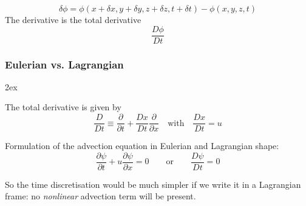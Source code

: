\documentclass[aspectratio=149,9pt]{beamer}
\begin{document}
\begin{frame}
\hspace*{1cm}%
	\parbox[b]{.55\textwidth}{
		\begin{equation*}
			\delta \phi = \phi (x + \delta x, y + \delta y, z + \delta z, t + \delta t) -\phi (x,y,z,t)
		\end{equation*}
		The derivative is the total derivative
		\begin{equation*}
			 \frac{D \phi}{D t}
		\end{equation*}
	}
\end{frame}
%
%
\begin{frame}
	\frametitle{Eulerian vs. Lagrangian}
	\begin{myitemize}{2ex}
		\item The total derivative is given by
			\begin{equation*}
				\frac{D}{D t} \equiv \frac{\partial}{\partial t} + \frac{D x}{D t} \frac{\partial}{\partial x}
				\quad \text{with} \quad \frac{D x}{D t} = u
			\end{equation*}\vspace*{2mm}
		\item Formulation of the advection equation in Eulerian and Lagrangian shape:
			\begin{equation*}
				 \frac{\partial \psi}{\partial t} + u \frac{\partial \psi}{\partial x} = 0 \qquad\text{or}\qquad \frac{D \psi}{D t} =0
			\end{equation*}
		\item So the time discretisation would be much simpler if we write it in a Lagrangian frame: no \emph{nonlinear} advection term will be present.
	\end{myitemize}
\end{frame}
%
%
\end{document}
